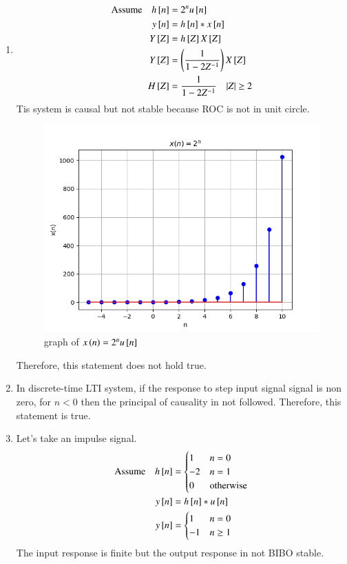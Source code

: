 \documentclass[journal,12pt,twocolumn]{IEEEtran}
\theoremstyle{remark}
\begin{document}
\begin{enumerate}
    \item
    \begin{align}
        \text{Assume}\quad h{}\left[n\right]&=2^nu{}\left[n\right]\\
        y{}\left[n\right]&=h{}\left[n\right]*x{}\left[n\right]\\
        Y{}\left[Z\right]&=h{}\left[Z\right] X{}\left[Z\right]\\
        Y{}\left[Z\right]&=\left(\frac{1}{1-2Z^{-1}}\right)X{}\left[Z\right]\\
        H{}\left[Z\right]&=\frac{1}{1-2Z^{-1}}\quad     |Z|\geq 2
    \end{align}
    Tis system is causal but not stable because ROC is not in unit circle.
    
    \begin{figure}[ht]
    \renewcommand\thefigure{1}
        \centering
        \includegraphics[width=0.8\linewidth]{figs/graph31.png}
        \caption{graph of $x\left(n\right) = 2^nu{}\left[n\right]$}
    \end{figure}
    Therefore, this statement does not hold true.
    \item In discrete-time LTI system, if the response to step input signal signal is non zero, for $n<0$ then the principal of causality in not followed.
    Therefore, this statement is true.
    \item Let's take an impulse signal.
    \begin{align}
            \text{Assume}\quad h{}\left[n\right] &= \begin{cases} 
                1 & n = 0 \\
                -2 & n = 1 \\
              0 & \text{otherwise}
        \end{cases}\\
        y{}\left[n\right]&=h{}\left[n\right]*u{}\left[n\right]\\
        y{}\left[n\right] &= \begin{cases}
            1 & n=0\\
            -1 & n\geq1
        \end{cases}
    \end{align}
    The input response is finite but the output response in not BIBO stable.
    

\end{enumerate}
\end{document}
